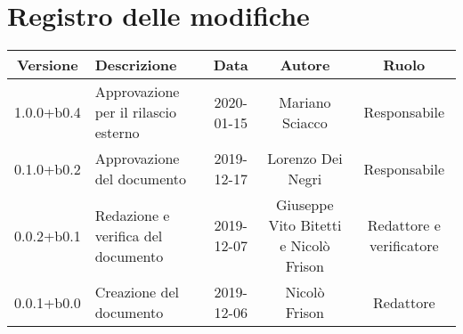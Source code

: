 \section*{Registro delle modifiche}

\begin{center}
	\begin{longtable}{|c|p{3cm}|c|c|c|}
	\hline
	\rowcolor{lighter-grayer}
	\textbf{Versione} & \textbf{Descrizione} & \textbf{Data} & \textbf{Autore} & \textbf{Ruolo} \\
	\hline
	\endfirsthead


	1.0.0+b0.4 & Approvazione per il rilascio esterno & 2020-01-15 & Mariano Sciacco & Responsabile \\
	\hline
	0.1.0+b0.2 & Approvazione del documento & 2019-12-17 & Lorenzo Dei Negri & Responsabile \\
	\hline
	0.0.2+b0.1 & Redazione e verifica del documento & 2019-12-07 & Giuseppe Vito Bitetti e Nicolò Frison & Redattore e verificatore \\
	\hline
	0.0.1+b0.0 & Creazione del documento & 2019-12-06 & Nicolò Frison & Redattore \\

	\hline

	\end{longtable}
\end{center}
